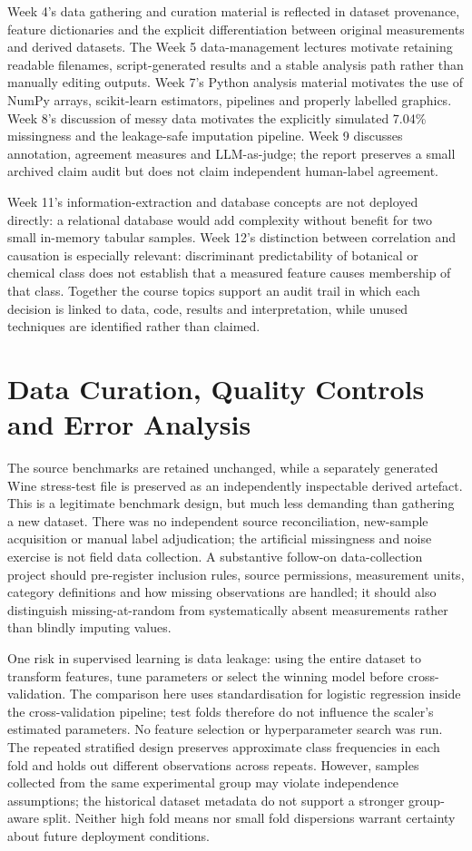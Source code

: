 \documentclass[11pt]{article}
\begin{document}
Week 4's data gathering and curation material is reflected in dataset provenance, feature dictionaries and the explicit differentiation between original measurements and derived datasets. The Week 5 data-management lectures motivate retaining readable filenames, script-generated results and a stable analysis path rather than manually editing outputs. Week 7's Python analysis material motivates the use of NumPy arrays, scikit-learn estimators, pipelines and properly labelled graphics. Week 8's discussion of messy data motivates the explicitly simulated 7.04\% missingness and the leakage-safe imputation pipeline. Week 9 discusses annotation, agreement measures and LLM-as-judge; the report preserves a small archived claim audit but does not claim independent human-label agreement.

Week 11's information-extraction and database concepts are not deployed directly: a relational database would add complexity without benefit for two small in-memory tabular samples. Week 12's distinction between correlation and causation is especially relevant: discriminant predictability of botanical or chemical class does not establish that a measured feature causes membership of that class. Together the course topics support an audit trail in which each decision is linked to data, code, results and interpretation, while unused techniques are identified rather than claimed.

\section{Data Curation, Quality Controls and Error Analysis}
The source benchmarks are retained unchanged, while a separately generated Wine stress-test file is preserved as an independently inspectable derived artefact. This is a legitimate benchmark design, but much less demanding than gathering a new dataset. There was no independent source reconciliation, new-sample acquisition or manual label adjudication; the artificial missingness and noise exercise is not field data collection. A substantive follow-on data-collection project should pre-register inclusion rules, source permissions, measurement units, category definitions and how missing observations are handled; it should also distinguish missing-at-random from systematically absent measurements rather than blindly imputing values.

One risk in supervised learning is data leakage: using the entire dataset to transform features, tune parameters or select the winning model before cross-validation. The comparison here uses standardisation for logistic regression inside the cross-validation pipeline; test folds therefore do not influence the scaler's estimated parameters. No feature selection or hyperparameter search was run. The repeated stratified design preserves approximate class frequencies in each fold and holds out different observations across repeats. However, samples collected from the same experimental group may violate independence assumptions; the historical dataset metadata do not support a stronger group-aware split. Neither high fold means nor small fold dispersions warrant certainty about future deployment conditions.
\end{document}
